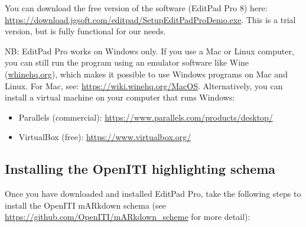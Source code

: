 \documentclass[
]{book}
\providecommand{\tightlist}{%
  \setlength{\itemsep}{0pt}\setlength{\parskip}{0pt}}
\begin{document}
You can download the free version of the software (EditPad Pro 8) here: \url{https://download.jgsoft.com/editpad/SetupEditPadProDemo.exe}. This is a trial version, but is fully functional for our needs.

NB: EditPad Pro works on Windows only. If you use a Mac or Linux computer, you can still run the program using an emulator software like Wine (\href{https://www.winehq.org/}{whinehq.org}), which makes it possible to use Windows programs on Mac and Linux. For Mac, see: \url{https://wiki.winehq.org/MacOS}. Alternatively, you can install a virtual machine on your computer that runs Windows:

\begin{itemize}
\tightlist
\item
  Parallels (commercial): \url{https://www.parallels.com/products/desktop/}
\item
  VirtualBox (free): \url{https://www.virtualbox.org/}
\end{itemize}

\hypertarget{installing-the-openiti-highlighting-schema}{%
\subsection{Installing the OpenITI highlighting schema}\label{installing-the-openiti-highlighting-schema}}

Once you have downloaded and installed EditPad Pro, take the following steps to install the OpenITI mARkdown schema (see \url{https://github.com/OpenITI/mARkdown_scheme} for more detail):
\end{document}
